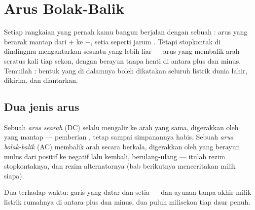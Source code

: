 \chapter{Arus Bolak-Balik}\label{ch:g9:alternating-current}

Setiap rangkaian yang pernah kamu bangun berjalan dengan sebuah
: arus yang berarak mantap dari $+$ ke $-$, setia seperti jarum
. Tetapi stopkontak di dindingmu mengantarkan sesuatu yang lebih
liar --- arus yang membalik arah seratus kali tiap sekon, dengan
 berayun tanpa henti di antara plus dan minus. Temuilah : bentuk yang di dalamnya boleh dikatakan seluruh listrik
dunia lahir, dikirim, dan diantarkan.

\section{Dua jenis arus}

\begin{definition}\label{def:g9:alternating-current:dcac}
Sebuah \emph{arus searah} (DC) selalu mengalir ke
arah yang sama, digerakkan oleh  yang mantap --- pemberian
, tetap sampai simpanannya habis. Sebuah \emph{arus
bolak-balik} (AC) membalik arah secara
berkala, digerakkan oleh  yang berayun mulus dari positif ke
negatif lalu kembali, berulang-ulang --- itulah rezim stopkontaknya,
dan rezim alternatornya (bab berikutnya menceritakan milik siapa).
\end{definition}

\begin{omfigure}

{\small Dua  terhadap waktu: garis  yang datar dan
setia --- dan ayunan tanpa akhir milik listrik rumahnya di antara plus
dan minus, dua puluh milisekon tiap daur penuh.}
\end{omfigure}

